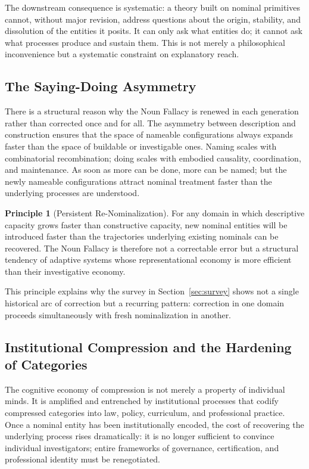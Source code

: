 \documentclass[12pt, a4paper]{article}
\theoremstyle{plain}
\theoremstyle{definition}
\newtheorem{principle}[theorem]{Principle}
\theoremstyle{remark}
\begin{document}
The downstream consequence is systematic: a theory built on nominal primitives
cannot, without major revision, address questions about the origin, stability,
and dissolution of the entities it posits. It can only ask what entities do;
it cannot ask what processes produce and sustain them. This is not merely a
philosophical inconvenience but a systematic constraint on explanatory reach.

\subsection{The Saying-Doing Asymmetry}

There is a structural reason why the Noun Fallacy is renewed in each generation
rather than corrected once and for all. The asymmetry between description and
construction ensures that the space of nameable configurations always expands
faster than the space of buildable or investigable ones. Naming scales with combinatorial recombination; doing
scales with embodied causality, coordination, and maintenance. As soon as
more can be done, more can be named; but the newly nameable configurations
attract nominal treatment faster than the underlying processes are understood.

\begin{principle}[Persistent Re-Nominalization]
For any domain in which descriptive capacity grows faster than constructive
capacity, new nominal entities will be introduced faster than the trajectories
underlying existing nominals can be recovered. The Noun Fallacy is therefore
not a correctable error but a structural tendency of adaptive systems whose
representational economy is more efficient than their investigative economy.
\end{principle}

This principle explains why the survey in Section~\ref{sec:survey} shows
not a single historical arc of correction but a recurring pattern: correction
in one domain proceeds simultaneously with fresh nominalization in another.

\subsection{Institutional Compression and the Hardening of Categories}

The cognitive economy of compression is not merely a property of individual
minds. It is amplified and entrenched by institutional processes that codify
compressed categories into law, policy, curriculum, and professional practice.
Once a nominal entity has been institutionally encoded, the cost of recovering
the underlying process rises dramatically: it is no longer sufficient to
convince individual investigators; entire frameworks of governance, certification,
and professional identity must be renegotiated.
\end{document}
